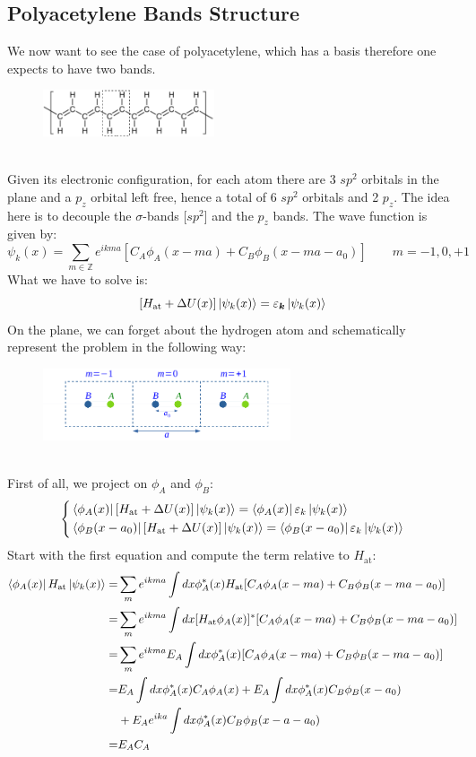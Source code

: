 \documentclass[10.75pt,a4paper,openright,bottom=2cm]{article}
\renewcommand{\Vec}[1]{\boldsymbol{#1}}
\begin{document}
\subsection{Polyacetylene Bands Structure}
We now want to see the case of polyacetylene, which has a basis therefore one expects to have two bands.
\begin{figure}[h]
    \centering
    \includegraphics[width=0.45\textwidth]{polyacetylene.pdf}
    \label{fig:polyacetylene}
\end{figure}\\
\noindent
Given its electronic configuration, for each atom there are 3 $sp^2$ orbitals in the plane and a $p_z$ orbital left free, hence a total of 6 $sp^2$ orbitals and 2 $p_z$. The idea here is to decouple the $\sigma$-bands [$sp^2$] and the $p_z$ bands. The wave function is given by:
\[
\psi_k(x)=\sum_{m\in\mathbb{Z}}e^{ikma}[C_A\phi_A(x-ma)+C_B\phi_B(x-ma-a_0)] \qquad m=-1,0,+1
\]
What we have to solve is:
\[
[H_{\text{at}}+\Delta U(x)]\ket{\psi_k(x)}=\varepsilon_{\Vec{k}}\ket{\psi_k(x)}
\]
\newpage\noindent
On the plane, we can forget about the hydrogen atom and schematically represent the problem in the following way:
\begin{figure}[h]
    \centering
    \includegraphics[width=0.65\textwidth]{polyscheme.pdf}
    \label{fig:polyscheme}
\end{figure}\\
\noindent
First of all, we project on $\phi_A$ and $\phi_B$:
\[
\left\{
\begin{aligned}
&\bra{\phi_A(x)}[H_{\text{at}}+\Delta U(x)]\ket{\psi_k(x)}=\bra{\phi_A(x)}\varepsilon_k\ket{\psi_k(x)}\\
&\bra{\phi_B(x-a_0)}[H_{\text{at}}+\Delta U(x)]\ket{\psi_k(x)}=\bra{\phi_B(x-a_0)}\varepsilon_k\ket{\psi_k(x)}
\end{aligned}
\right.
\]
Start with the first equation and compute the term relative to $H_{\text{at}}$:
\begin{align*}
\bra{\phi_A(x)}H_{\text{at}}\ket{\psi_k(x)}=&\sum_me^{ikma}\int dx\phi_A^*(x)H_{\text{at}}[C_A\phi_A(x-ma)+C_B\phi_B(x-ma-a_0)]\\
=&\sum_me^{ikma}\int dx[H_{\text{at}}\phi_A(x)]^*[C_A\phi_A(x-ma)+C_B\phi_B(x-ma-a_0)]\\
=&\sum_me^{ikma}E_A\int dx\phi_A^*(x)[C_A\phi_A(x-ma)+C_B\phi_B(x-ma-a_0)]\\
=&E_A\int dx\phi_A^*(x)C_A\phi_A(x)+E_A\int dx\phi_A^*(x)C_B\phi_B(x-a_0)\\
&+E_Ae^{ika}\int dx\phi_A^*(x)C_B\phi_B(x-a-a_0)\\
=&E_AC_A
\end{align*}
\end{document}
